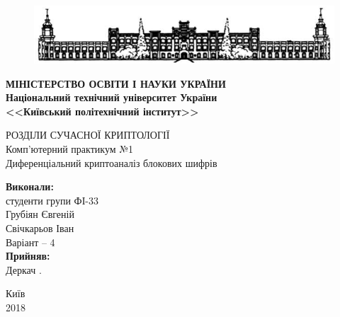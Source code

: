 \documentclass[12pt,a4paper]{article}
\begin{document}
\begin{titlepage}
  \begin{center}

\begin{figure}
  \centering
    \includegraphics{shapkaKPI}
\end{figure}

 \Large \textbf{МІНІСТЕРСТВО ОСВІТИ І НАУКИ УКРАЇНИ}\\
      \textbf{ Національний технічний університет України\\
      <<Київський політехнічний інститут>>}\\

       \vspace{2 cm}
    
РОЗДІЛИ СУЧАСНОЇ КРИПТОЛОГІЇ\\
Комп’ютерний практикум №1\\
\vspace{1 cm}
Диференціальний криптоаналіз блокових шифрів \\
    \vfill
    \vfill
  
\newlength{\ML}
\hfill\begin{minipage}{0.4\textwidth}
 \textbf{Виконали:}\\
 студенти групи ФІ-33\\
 Грубіян Євгеній\\
 Свічкарьов Іван\\
 Варіант -- 4 \\
 \textbf{Прийняв:}\\
 Деркач .\\
\end{minipage}%
\vfill
\vfill  
 

  
\begin{center}
  Київ\\
  2018
\end{center}
\end{center}
\end{titlepage}

\setcounter{page}{2} %
\end{document}
